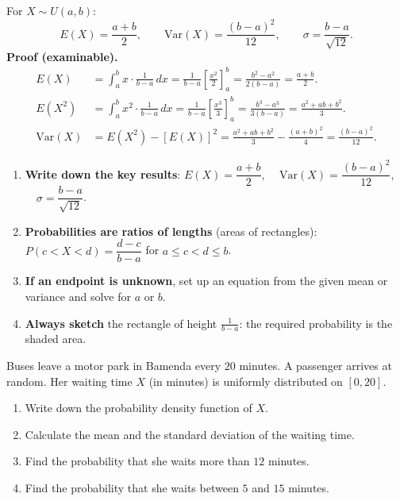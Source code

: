\documentclass[11pt]{article}
\begin{document}
\begin{propriete}
For $X \sim U(a,b)$:
\[
E(X) = \frac{a+b}{2}, \qquad \mathrm{Var}(X) = \frac{(b-a)^{2}}{12}, \qquad \sigma = \frac{b-a}{\sqrt{12}}.
\]
\textbf{Proof (examinable).}
\begin{align*}
E(X) &= \int_{a}^{b} x \cdot \frac{1}{b-a}\,dx = \frac{1}{b-a} \left[ \frac{x^{2}}{2} \right]_{a}^{b} = \frac{b^{2}-a^{2}}{2(b-a)} = \frac{a+b}{2}. \\[6pt]
E(X^{2}) &= \int_{a}^{b} x^{2} \cdot \frac{1}{b-a}\,dx = \frac{1}{b-a} \left[ \frac{x^{3}}{3} \right]_{a}^{b} = \frac{b^{3}-a^{3}}{3(b-a)} = \frac{a^{2}+ab+b^{2}}{3}. \\[6pt]
\mathrm{Var}(X) &= E(X^{2}) - [E(X)]^{2} = \frac{a^{2}+ab+b^{2}}{3} - \frac{(a+b)^{2}}{4} = \frac{(b-a)^{2}}{12}.
\end{align*}
\end{propriete}

\begin{methode}
\begin{enumerate}
\item \textbf{Write down the key results}:
$E(X) = \dfrac{a+b}{2}$, $\quad \mathrm{Var}(X) = \dfrac{(b-a)^{2}}{12}$, $\quad \sigma = \dfrac{b-a}{\sqrt{12}}$.
\item \textbf{Probabilities are ratios of lengths} (areas of rectangles):
$P(c < X < d) = \dfrac{d-c}{b-a}$ for $a \leq c < d \leq b$.
\item \textbf{If an endpoint is unknown}, set up an equation from the given mean or variance and solve for $a$ or $b$.
\item \textbf{Always sketch} the rectangle of height $\frac{1}{b-a}$: the required probability is the shaded area.
\end{enumerate}
\end{methode}

\begin{exemplebox}
Buses leave a motor park in Bamenda every $20$ minutes. A passenger arrives at random. Her waiting time $X$ (in minutes) is uniformly distributed on $[0, 20]$.
\begin{enumerate}
\item[(a)] Write down the probability density function of $X$.
\item[(b)] Calculate the mean and the standard deviation of the waiting time.
\item[(c)] Find the probability that she waits more than $12$ minutes.
\item[(d)] Find the probability that she waits between $5$ and $15$ minutes.
\end{enumerate}
\end{exemplebox}
\end{document}
